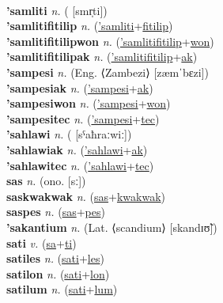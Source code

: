  \label{'samoatilip} \\
\textbf{'samliti} \textit{n.} ( [smr̩ti])
 \label{'samliti} \\
\textbf{'samlitifitilip} \textit{n.} (\hyperref['samliti]{'samliti}+\hyperref[fitilip]{fitilip})
 \label{'samlitifitilip} \\
\textbf{'samlitifitilipwon} \textit{n.} (\hyperref['samlitifitilip]{'samlitifitilip}+\hyperref[won]{won})
 \label{'samlitifitilipwon} \\
\textbf{'samlitifitilipak} \textit{n.} (\hyperref['samlitifitilip]{'samlitifitilip}+\hyperref[ak]{ak})
 \label{'samlitifitilipak} \\
\textbf{'sampesi} \textit{n.} (Eng. ⟨Zambezi⟩ [zæmˈbɛzi])
 \label{'sampesi} \\
\textbf{'sampesiak} \textit{n.} (\hyperref['sampesi]{'sampesi}+\hyperref[ak]{ak})
 \label{'sampesiak} \\
\textbf{'sampesiwon} \textit{n.} (\hyperref['sampesi]{'sampesi}+\hyperref[won]{won})
 \label{'sampesiwon} \\
\textbf{'sampesitec} \textit{n.} (\hyperref['sampesi]{'sampesi}+\hyperref[tec]{tec})
 \label{'sampesitec} \\
\textbf{'sahlawi} \textit{n.} ( [sˤaħraːwiː])
 \label{'sahlawi} \\
\textbf{'sahlawiak} \textit{n.} (\hyperref['sahlawi]{'sahlawi}+\hyperref[ak]{ak})
 \label{'sahlawiak} \\
\textbf{'sahlawitec} \textit{n.} (\hyperref['sahlawi]{'sahlawi}+\hyperref[tec]{tec})
 \label{'sahlawitec} \\
\textbf{sas} \textit{n.} (ono. [sː])
 \label{sas} \\
\textbf{saskwakwak} \textit{n.} (\hyperref[sas]{sas}+\hyperref[kwakwak]{kwakwak})
 \label{saskwakwak} \\
\textbf{saspes} \textit{n.} (\hyperref[sas]{sas}+\hyperref[pes]{pes})
 \label{saspes} \\
\textbf{'sakantium} \textit{n.} (Lat. ⟨scandium⟩ [skandɪʊ̃])
 \label{'sakantium} \\
\textbf{sati} \textit{v.} (\hyperref[sa]{sa}+\hyperref[ti]{ti})
 \label{sati} \\
\textbf{satiles} \textit{n.} (\hyperref[sati]{sati}+\hyperref[les]{les})
 \label{satiles} \\
\textbf{satilon} \textit{n.} (\hyperref[sati]{sati}+\hyperref[lon]{lon})
 \label{satilon} \\
\textbf{satilum} \textit{n.} (\hyperref[sati]{sati}+\hyperref[lum]{lum})
